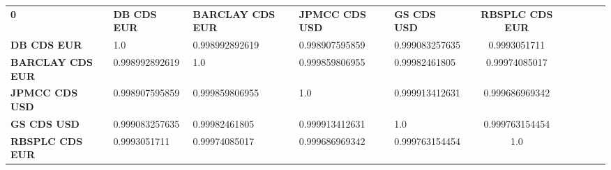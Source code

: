 \begin{center}
 \begin{tabular}{|l|l|l|l|l|c|c|c|c|c|}
\hline
\textbf{0} & \textbf{DB CDS EUR} & \textbf{BARCLAY CDS EUR} & \textbf{JPMCC CDS USD} & \textbf{GS CDS USD} & \textbf{RBSPLC CDS EUR}\\\hhline{|=|=|=|=|=|=|}
\textbf{DB CDS EUR} & 1.0 & 0.998992892619 & 0.998907595859 & 0.999083257635 & 0.9993051711\\
\textbf{BARCLAY CDS EUR} & 0.998992892619 & 1.0 & 0.999859806955 & 0.99982461805 & 0.99974085017\\
\textbf{JPMCC CDS USD} & 0.998907595859 & 0.999859806955 & 1.0 & 0.999913412631 & 0.999686969342\\
\textbf{GS CDS USD} & 0.999083257635 & 0.99982461805 & 0.999913412631 & 1.0 & 0.999763154454\\
\textbf{RBSPLC CDS EUR} & 0.9993051711 & 0.99974085017 & 0.999686969342 & 0.999763154454 & 1.0\\
\hline
\end{tabular}
\end{center}